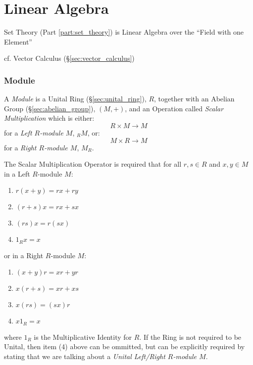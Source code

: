 \part{Linear Algebra}\label{part:linear_algebra}

Set Theory (Part \ref{part:set_theory}) is Linear Algebra over the
``Field with one Element''

cf. Vector Calculus (\S\ref{sec:vector_calculus})



\section{Module}\label{sec:module}

A \emph{Module} is a Unital Ring (\S\ref{sec:unital_ring}), $R$,
together with an Abelian Group (\S\ref{sec:abelian_group}), $(M, +)$,
and an Operation called \emph{Scalar Multiplication} which is either:
\[ R \times M \rightarrow M \]
for a \emph{Left $R$-module $M$}, $_R M$, or:
\[ M \times R \rightarrow M \]
for a \emph{Right $R$-module $M$}, $M_R$.

The Scalar Multiplication Operator is required that for all $r,s \in
R$ and $x,y \in M$ in a Left $R$-module $M$:
\begin{enumerate}
    \item $r(x + y) = rx + ry$
    \item $(r + s)x = rx + sx$
    \item $(rs)x = r(sx)$
    \item $1_Rx = x$
\end{enumerate}
or in a Right $R$-module $M$:
\begin{enumerate}
    \item $(x + y)r = xr + yr$
    \item $x(r + s) = xr + xs$
    \item $x(rs) = (sx)r$
    \item $x 1_R = x$
\end{enumerate}
where $1_R$ is the Multiplicative Identity for $R$. If the Ring is not
required to be Unital, then item (4) above can be ommitted, but can be
explicitly required by stating that we are talking about a
\emph{Unital Left/Right $R$-module $M$}.

